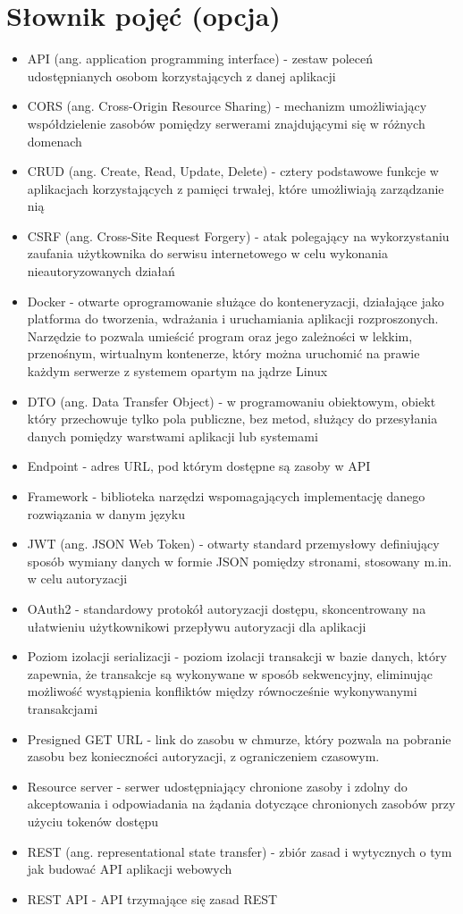 \documentclass[../main.tex]{subfiles}
\begin{document}
    \section{Słownik pojęć (opcja)}
    \begin{itemize}
        \item API (ang. application programming interface) - zestaw poleceń udostępnianych osobom korzystających z danej aplikacji
        \item CORS (ang. Cross-Origin Resource Sharing) - mechanizm umożliwiający współdzielenie zasobów pomiędzy serwerami znajdującymi się w różnych domenach
        \item CRUD (ang. Create, Read, Update, Delete) - cztery podstawowe funkcje w aplikacjach korzystających z pamięci trwałej, które umożliwiają zarządzanie nią
        \item CSRF (ang. Cross-Site Request Forgery) - atak polegający na wykorzystaniu zaufania użytkownika do serwisu internetowego w celu wykonania nieautoryzowanych działań
        \item Docker - otwarte oprogramowanie służące do konteneryzacji, działające jako platforma do tworzenia, wdrażania i uruchamiania aplikacji rozproszonych.
        Narzędzie to pozwala umieścić program oraz jego zależności w lekkim, przenośnym, wirtualnym kontenerze, który można uruchomić na prawie każdym serwerze z systemem opartym na jądrze Linux
        \item DTO (ang. Data Transfer Object) - w programowaniu obiektowym, obiekt który przechowuje tylko pola publiczne, bez metod, służący do przesyłania danych pomiędzy warstwami aplikacji lub systemami
        \item Endpoint - adres URL, pod którym dostępne są zasoby w API
        \item Framework - biblioteka narzędzi wspomagających implementację danego rozwiązania w danym języku
        \item JWT (ang. JSON Web Token) - otwarty standard przemysłowy definiujący sposób wymiany danych w formie JSON pomiędzy stronami, stosowany m.in. w celu autoryzacji
        \item OAuth2 - standardowy protokół autoryzacji dostępu, skoncentrowany na ułatwieniu użytkownikowi przepływu autoryzacji dla aplikacji
        \item Poziom izolacji serializacji - poziom izolacji transakcji w bazie danych, który zapewnia, że transakcje są wykonywane w sposób sekwencyjny, eliminując możliwość wystąpienia konfliktów między równocześnie wykonywanymi transakcjami
        \item Presigned GET URL - link do zasobu w chmurze, który pozwala na pobranie zasobu bez konieczności autoryzacji, z ograniczeniem czasowym.
        \item Resource server - serwer udostępniający chronione zasoby i zdolny do akceptowania i odpowiadania na żądania dotyczące chronionych zasobów przy użyciu tokenów dostępu
        \item REST (ang. representational state transfer) - zbiór zasad i wytycznych o tym jak budować API aplikacji webowych
        \item REST API - API trzymające się zasad REST
    \end{itemize}
\end{document}
